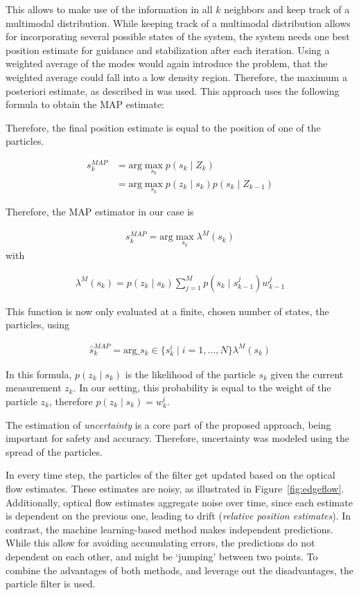 \documentclass{report}
\begin{document}
This allows to make use of the information in all $k$ neighbors and
keep track of a multimodal distribution. While keeping track of a
multimodal distribution allows for incorporating several possible
states of the system, the system needs one best position estimate for
guidance and stabilization after each iteration. Using a weighted
average of the modes would again introduce the problem, that the
weighted average could fall into a low density region. Therefore, the
maximum a posteriori estimate, as described in \cite{driessen2008map}
was used. This approach uses the following formula to obtain the MAP
estimate:

Therefore, the final position estimate is equal to the position of one
of the particles.

\begin{align}
  s_k^{MAP}  &= \text{arg}\max_{s_k}{p(s_k \mid Z_k)}\\
             &= \text{arg}\max_{s_k}{p(z_k \mid s_k) p(s_k \mid Z_{k-1})} 
\end{align}

Therefore, the MAP estimator in our case is

\begin{align}
s_k^{MAP} = \text{arg}\max_{s_k} \lambda^M(s_k)
\end{align}
with

\begin{align}
\lambda^M(s_k) = p(z_k \mid s_k) \sum_{j=1}^Mp(s_k \mid s_{k-1}^j)w^j_{k-1}
\end{align}

This function is now only evaluated at a finite, chosen number of
states, the particles, using

\begin{align}
\hat{s}_k^{MAP} = \text{arg}\_{s_k \in \{s_k^i \mid i=1,\ldots,N\}} \lambda^M(s_k)
\end{align}

In this formula, $p(z_k \mid s_k)$ is the likelihood of the particle
$s_k$ given the current measurement $z_k$. In our setting, this
probability is equal to the weight of the particle $z_k$, therefore
$p(z_k \mid s_k) = w^i_k$.

The estimation of \emph{uncertainty} is a core part of the proposed
approach, being important for safety and accuracy. Therefore,
uncertainty was modeled using the spread of the particles.

In every time step, the particles of the filter get updated based on
the optical flow estimates. These estimates are noisy, as illustrated
in Figure~\ref{fig:edgeflow}. Additionally, optical flow estimates
aggregate noise over time, since each estimate is dependent on the
previous one, leading to drift (\emph{relative position
  estimates}). In contrast, the machine learning-based method makes
independent predictions. While this allow for avoiding accumulating
errors, the predictions do not dependent on each other, and might be
`jumping' between two points. To combine the advantages of both
methods, and leverage out the disadvantages, the particle filter is
used.
\end{document}
